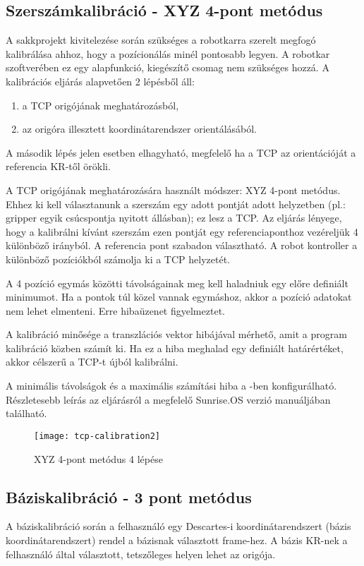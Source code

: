 \documentclass[../documentation.tex]{subfiles}
\begin{document}
\newpage
\subsection{Szerszámkalibráció - XYZ 4-pont metódus}
A sakkprojekt kivitelezése során szükséges a robotkarra szerelt megfogó kalibrálása ahhoz, hogy a pozícionálás minél pontosabb legyen. A robotkar szoftverében ez egy alapfunkció, kiegészítő csomag nem szükséges hozzá. A kalibrációs eljárás alapvetően 2 lépésből áll:
\begin{enumerate}
	\item a TCP origójának meghatározásból,
	\item az origóra illesztett koordinátarendszer orientálásából.
\end{enumerate}
A második lépés jelen esetben elhagyható, megfelelő ha a TCP az orientációját a referencia KR-től örökli. 

A TCP origójának meghatározására használt módszer: XYZ 4-pont metódus. Ehhez ki kell választanunk a szerszám egy adott pontját adott helyzetben (pl.: gripper egyik csúcspontja nyitott állásban); ez lesz a TCP. Az eljárás lényege, hogy a kalibrálni kívánt szerszám ezen pontját egy referenciaponthoz vezéreljük 4 különböző irányból. A referencia pont szabadon választható. A robot kontroller a különböző  pozíciókból számolja ki a TCP helyzetét.

A 4  pozíció egymás közötti távolságainak meg kell haladniuk egy előre definiált minimumot. Ha a pontok túl közel vannak egymáshoz, akkor a pozíció adatokat nem lehet elmenteni. Erre hibaüzenet figyelmeztet.

A kalibráció minősége a transzlációs vektor hibájával mérhető, amit a program kalibráció közben számít ki. Ha ez a hiba meghalad egy definiált határértéket, akkor célszerű a TCP-t újból kalibrálni.

A minimális távolságok és a maximális számítási hiba a -ben konfigurálható. Részletesebb leírás az eljárásról a megfelelő Sunrise.OS verzió manuáljában található\cite{sunrisemanual}.

\begin{figure}[h]
	\centering
	\texttt{[image: tcp-calibration2]}
	\caption{XYZ 4-pont metódus 4 lépése\cite{sunrisemanual}}
	\label{fig:tcp-examples}
\end{figure}

\subsection{Báziskalibráció - 3 pont metódus}
A báziskalibráció során a felhasználó egy Descartes-i koordinátarendszert (bázis koordinátarendszert) rendel a bázisnak választott frame-hez. A bázis KR-nek a felhasználó által választott, tetszőleges helyen lehet az origója.
\end{document}
